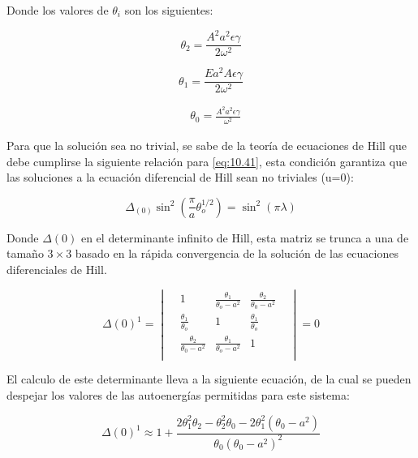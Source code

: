 Donde los valores de $\theta_i$ son los siguientes:

\begin{equation}\label{eq:10.42}
    \theta_2=\frac{A^2a^2\epsilon\gamma}{2\omega^2}
\end{equation}

\begin{equation}\label{eq:10.43}
    \theta_1=\frac{Ea^2A\epsilon\gamma}{2\omega^2}
\end{equation}

\begin{equation}\label{eq:10.44}
\begin{split}
       &\theta_0=\frac{A^2a^2\epsilon\gamma}{\omega^2}
\end{split}
\end{equation}

Para que la solución sea no trivial, se sabe de la teoría de ecuaciones de Hill que debe cumplirse la siguiente relación para \ref{eq:10.41}, esta condición garantiza que las soluciones a la ecuación diferencial de Hill sean no triviales (u=0): 

\begin{equation}\label{eq:10.45}
\Delta_{(0)}\sin^2(\frac{\pi}{a}\theta_o^{1/2})=\sin^2(\pi\lambda)
\end{equation}

Donde $\Delta(0)$ en el determinante infinito de Hill, esta matriz se trunca a una de tamaño $3 \times 3$ basado en la rápida convergencia de la solución de las ecuaciones diferenciales de Hill. 

\large
\begin{equation}\label{eq:10.46}
\Delta(0)^1=
\begin{vmatrix}
 & 1 & \frac{\theta_1}{\theta_o-a^2} & \frac{\theta_2}{\theta_0-a^2} & \\[0.3cm] 
 & \frac{\theta_1}{\theta_o} & 1 & \frac{\theta_1}{\theta_o} &  \\[0.3cm]
 & \frac{\theta_2}{\theta_0-a^2} & \frac{\theta_1}{\theta_o-a^2} & 1 &  \\[0.3cm] 
\end{vmatrix}=0
\end{equation}
\normalsize

El calculo de este determinante lleva a la siguiente ecuación, de la cual se pueden despejar los valores de las autoenergías permitidas para este sistema: 

\begin{equation}\label{eq:10.47}
    \Delta(0)^1\approx1+\frac{2\theta_1^2\theta_2-\theta_2^2\theta_0-2\theta_1^2(\theta_0-a^2)}{\theta_0(\theta_0-a^2)^2}
\end{equation}

